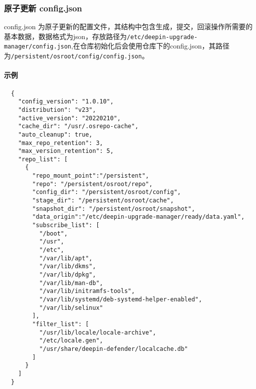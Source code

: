 \documentclass{utart}
\begin{document}
\subsubsection{原子更新 config.json}
config.json 为原子更新的配置文件，其结构中包含生成，提交，回滚操作所需要的基本数据，数据格式为json，存放路径为\texttt{/etc/deepin-upgrade-manager/config.json},在仓库初始化后会使用仓库下的config.json，其路径为\texttt{/persistent/osroot/config/config.json}。

\paragraph{示例}
\begin{lstlisting}
  {
    "config_version": "1.0.10",
    "distribution": "v23",
    "active_version": "20220210",
    "cache_dir": "/usr/.osrepo-cache",
    "auto_cleanup": true,
    "max_repo_retention": 3,
    "max_version_retention": 5,
    "repo_list": [
      {
        "repo_mount_point":"/persistent",
        "repo": "/persistent/osroot/repo",
        "config_dir": "/persistent/osroot/config",
        "stage_dir": "/persistent/osroot/cache",
        "snapshot_dir": "/persistent/osroot/snapshot",
        "data_origin":"/etc/deepin-upgrade-manager/ready/data.yaml",
        "subscribe_list": [
          "/boot",
          "/usr",
          "/etc",
          "/var/lib/apt",
          "/var/lib/dkms",
          "/var/lib/dpkg",
          "/var/lib/man-db",
          "/var/lib/initramfs-tools",
          "/var/lib/systemd/deb-systemd-helper-enabled",
          "/var/lib/selinux"
        ],
        "filter_list": [
          "/usr/lib/locale/locale-archive",
          "/etc/locale.gen",
          "/usr/share/deepin-defender/localcache.db"
        ]
      }
    ]
  }
\end{lstlisting}
\end{document}
